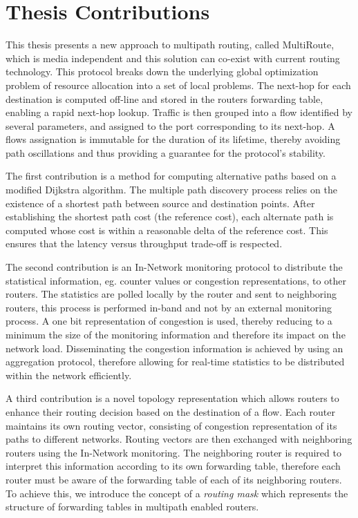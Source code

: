 \section{Thesis Contributions}
\label{sect:contributions}

This thesis presents a new approach to multipath routing, called MultiRoute,
which is media independent and this solution can co-exist with current routing
technology. This protocol breaks down the underlying global optimization problem
of resource allocation into a set of local problems. The next-hop for each
destination is computed off-line and stored in the routers forwarding table,
enabling a rapid next-hop lookup. Traffic is then grouped into a flow identified
by several parameters, and assigned to the port corresponding to its next-hop. A
flows assignation is immutable for the duration of its lifetime, thereby
avoiding path oscillations and thus providing a guarantee for the
protocol's stability.

The first contribution is a method for computing alternative paths based on a
modified Dijkstra algorithm. The multiple path discovery process relies on the
existence of a shortest path between source and destination points. After
establishing the shortest path cost (the reference cost), each alternate path is
computed whose cost is within a reasonable delta of the reference cost. This
ensures that the latency versus throughput trade-off is respected.

The second contribution is an In-Network monitoring protocol to distribute the
statistical information, eg. counter values or congestion representations, to other routers. The statistics are polled locally by
the router and sent to neighboring routers, this process is performed in-band
and not by an external monitoring process. A one bit representation of
congestion is used, thereby reducing to a minimum the size of the monitoring
information and therefore its impact on the network load. Disseminating the
congestion information is achieved by using an aggregation protocol, therefore
allowing for real-time statistics to be distributed within the network
efficiently.

A third contribution is a novel topology representation which allows routers to
enhance their routing decision based on the destination of a flow. Each router
maintains its own routing vector, consisting of congestion representation of its
paths to different networks. Routing vectors are then exchanged with neighboring
routers using the In-Network monitoring. The neighboring router is required to
interpret this information according to its own forwarding table, therefore each
router must be aware of the forwarding table of each of its neighboring routers.
To achieve this, we introduce the concept of a \textit{routing mask} which
represents the structure of forwarding tables in multipath enabled routers.

